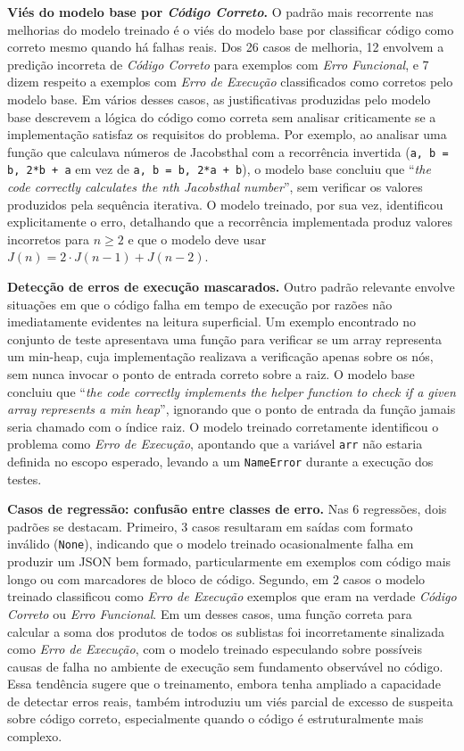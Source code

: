 \documentclass[conference]{IEEEtran}
\begin{document}
\textbf{Viés do modelo base por \emph{Código Correto}.}
O padrão mais recorrente nas melhorias do modelo treinado é o viés do modelo base por classificar código como correto mesmo quando há falhas reais. Dos 26 casos de melhoria, 12 envolvem a predição incorreta de \emph{Código Correto} para exemplos com \emph{Erro Funcional}, e 7 dizem respeito a exemplos com \emph{Erro de Execução} classificados como corretos pelo modelo base. Em vários desses casos, as justificativas produzidas pelo modelo base descrevem a lógica do código como correta sem analisar criticamente se a implementação satisfaz os requisitos do problema. Por exemplo, ao analisar uma função que calculava números de Jacobsthal com a recorrência invertida (\texttt{a, b = b, 2*b + a} em vez de \texttt{a, b = b, 2*a + b}), o modelo base concluiu que ``\emph{the code correctly calculates the nth Jacobsthal number}'', sem verificar os valores produzidos pela sequência iterativa. O modelo treinado, por sua vez, identificou explicitamente o erro, detalhando que a recorrência implementada produz valores incorretos para $n \geq 2$ e que o modelo deve usar $J(n) = 2 \cdot J(n-1) + J(n-2)$.

\textbf{Detecção de erros de execução mascarados.}
Outro padrão relevante envolve situações em que o código falha em tempo de execução por razões não imediatamente evidentes na leitura superficial. Um exemplo encontrado no conjunto de teste apresentava uma função para verificar se um array representa um min-heap, cuja implementação realizava a verificação apenas sobre os nós, sem nunca invocar o ponto de entrada correto sobre a raiz. O modelo base concluiu que ``\emph{the code correctly implements the helper function to check if a given array represents a min heap}'', ignorando que o ponto de entrada da função jamais seria chamado com o índice raiz. O modelo treinado corretamente identificou o problema como \emph{Erro de Execução}, apontando que a variável \texttt{arr} não estaria definida no escopo esperado, levando a um \texttt{NameError} durante a execução dos testes.

\textbf{Casos de regressão: confusão entre classes de erro.}
Nas 6 regressões, dois padrões se destacam. Primeiro, 3 casos resultaram em saídas com formato inválido (\texttt{None}), indicando que o modelo treinado ocasionalmente falha em produzir um JSON bem formado, particularmente em exemplos com código mais longo ou com marcadores de bloco de código. Segundo, em 2 casos o modelo treinado classificou como \emph{Erro de Execução} exemplos que eram na verdade \emph{Código Correto} ou \emph{Erro Funcional}. Em um desses casos, uma função correta para calcular a soma dos produtos de todos os sublistas foi incorretamente sinalizada como \emph{Erro de Execução}, com o modelo treinado especulando sobre possíveis causas de falha no ambiente de execução sem fundamento observável no código. Essa tendência sugere que o treinamento, embora tenha ampliado a capacidade de detectar erros reais, também introduziu um viés parcial de excesso de suspeita sobre código correto, especialmente quando o código é estruturalmente mais complexo.
\end{document}
